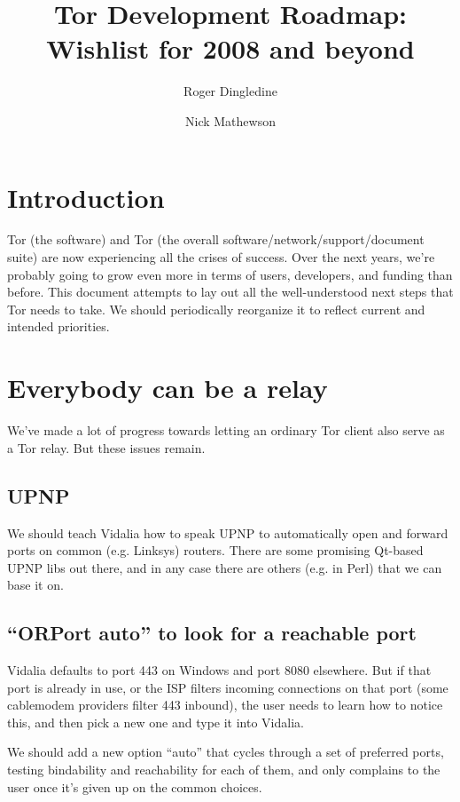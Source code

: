 \documentclass{article}
\begin{document}
\title{Tor Development Roadmap: Wishlist for 2008 and beyond}
\author{Roger Dingledine \and Nick Mathewson}
\date{}

\maketitle
\pagestyle{plain}

\section{Introduction}

Tor (the software) and Tor (the overall software/network/support/document
suite) are now experiencing all the crises of success.  Over the next
years, we're probably going to grow even more in terms of users, developers,
and funding than before. This document attempts to lay out all the
well-understood next steps that Tor needs to take. We should periodically
reorganize it to reflect current and intended priorities.

\section{Everybody can be a relay}

We've made a lot of progress towards letting an ordinary Tor client also
serve as a Tor relay. But these issues remain.

\subsection{UPNP}

We should teach Vidalia how to speak UPNP to automatically open and
forward ports on common (e.g. Linksys) routers. There are some promising
Qt-based UPNP libs out there, and in any case there are others (e.g. in
Perl) that we can base it on.

\subsection{``ORPort auto'' to look for a reachable port}

Vidalia defaults to port 443 on Windows and port 8080 elsewhere. But if
that port is already in use, or the ISP filters incoming connections
on that port (some cablemodem providers filter 443 inbound), the user
needs to learn how to notice this, and then pick a new one and type it
into Vidalia.

We should add a new option ``auto'' that cycles through a set of preferred
ports, testing bindability and reachability for each of them, and only
complains to the user once it's given up on the common choices.
\end{document}
